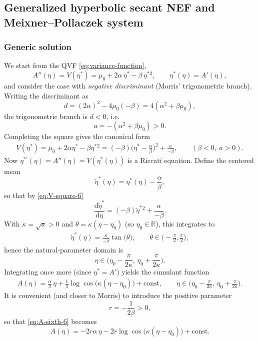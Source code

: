 \documentclass[a4paper,11pt]{article}
\numberwithin{equation}{section}
\theoremstyle{plain}
\theoremstyle{definition}
\theoremstyle{remark}
\newcommand{\R}{\ensuremath{\mathbb{R}}\xspace}
\newcommand{\1}{\ensuremath{\mathds{1}}\xspace}
\newcommand{\dd}{\ensuremath{{\textrm{d}}}\xspace}
\begin{document}
\subsection{Generalized hyperbolic secant NEF and Meixner--Pollaczek system}\label{sec:NEF-QVF-GHS}
\subsubsection{Generic solution}
We start from the QVF \eqref{eq:variance-function},
\[
A''(\eta)=V(\eta^\ast)=\mu_0+2\alpha\,\eta^\ast-\beta\,\eta^\ast{}^2,\qquad \eta^\ast(\eta)=A'(\eta),
\]
and consider the case with \emph{negative discriminant} (Morris’ trigonometric branch). Writing the
discriminant as
\[
d=(2\alpha)^2-4\mu_0(-\beta)=4(\alpha^2+\beta\mu_0),
\]
the trigonometric branch is $d<0$, i.e.
\[
a=-(\alpha^2+\beta\mu_0)>0.
\]
Completing the square gives the canonical form
\begin{align}
V(\eta^\ast)
=\mu_0+2\alpha\eta^\ast-\beta\eta^\ast{}^2
=(-\beta)\Big(\eta^\ast-\frac{\alpha}{\beta}\Big)^2+\frac{a}{-\beta},
\qquad(\beta<0,\ a>0).\label{eq:V-square-6}
\end{align}
Now $\eta^{\ast'}(\eta)=A''(\eta)=V(\eta^\ast(\eta))$ is a Riccati equation. Define the centered mean
\[
\tilde\eta^\ast(\eta)=\eta^\ast(\eta)-\frac{\alpha}{\beta},
\]
so that by \eqref{eq:V-square-6}
\[
\frac{\dd\tilde\eta^\ast}{\dd\eta}=(-\beta)\tilde\eta^\ast{}^2+\frac{a}{-\beta}.
\]
With $\kappa=\sqrt{a}>0$ and $\theta=\kappa(\eta-\eta_0)$ (so $\eta_0\in\R$), this integrates to
\begin{align}
\tilde\eta^\ast(\eta)
=\frac{\kappa}{-\beta}\tan\!\big(\theta\big),
\qquad
\theta\in\Big(-\frac{\pi}{2},\frac{\pi}{2}\Big),
\label{eq:eta-star-tan-6}
\end{align}
hence the natural-parameter domain is
\[
\eta\in\Big(\eta_0-\frac{\pi}{2\kappa},\,\eta_0+\frac{\pi}{2\kappa}\Big).
\]
Integrating once more (since $\eta^\ast=A'$) yields the cumulant function
\begin{align}
A(\eta)
=\frac{\alpha}{\beta}\,\eta+\frac{1}{\beta}\log\cos\!\big(\kappa(\eta-\eta_0)\big)+\text{const},
\qquad
\eta\in\Big(\eta_0-\frac{\pi}{2\kappa},\,\eta_0+\frac{\pi}{2\kappa}\Big).
\label{eq:A-sixth-6}
\end{align}
It is convenient (and closer to Morris) to introduce the positive parameter
\[
r=-\frac{1}{2\beta}>0,
\]
so that \eqref{eq:A-sixth-6} becomes
\[
A(\eta)
=-2r\alpha\,\eta-2r\log\cos\!\big(\kappa(\eta-\eta_0)\big)+\text{const}.
\]
\end{document}
